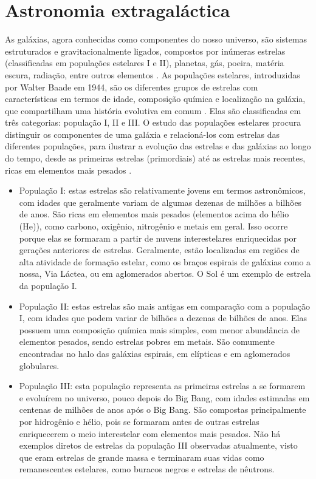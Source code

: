 \section{Astronomia extragaláctica}

As galáxias, agora conhecidas como componentes do nosso universo, são sistemas estruturados e gravitacionalmente ligados, compostos por inúmeras estrelas (classificadas em populações estelares I e II), planetas, gás, poeira, matéria escura, radiação, entre outros elementos \cite{2018inpe}. As populações estelares, introduzidas por Walter Baade em 1944, são os diferentes grupos de estrelas com características em termos de idade, composição química e localização na galáxia, que compartilham uma história evolutiva em comum \cite{2010arnab}. Elas são classificadas em três categorias: população I, II e III. O estudo das populações estelares procura distinguir os componentes de uma galáxia e relacioná-los com estrelas das diferentes populações, para ilustrar a evolução das estrelas e das galáxias ao longo do tempo, desde as primeiras estrelas (primordiais) até as estrelas mais recentes, ricas em elementos mais pesados \cite{2023Kepler}.

\begin{itemize}
  \item População I: estas estrelas são relativamente jovens em termos astronômicos, com idades que geralmente variam de algumas dezenas de milhões a bilhões de anos. São ricas em elementos mais pesados (elementos acima do hélio (He)), como carbono, oxigênio, nitrogênio e metais em geral. Isso ocorre porque elas se formaram a partir de nuvens interestelares enriquecidas por gerações anteriores de estrelas. Geralmente, estão localizadas em regiões de alta atividade de formação estelar, como os braços espirais de galáxias como a nossa, Via Láctea, ou em aglomerados abertos. O Sol é um exemplo de estrela da população I.
  \item População II: estas estrelas são mais antigas em comparação com a população I, com idades que podem variar de bilhões a dezenas de bilhões de anos. Elas possuem uma composição química mais simples, com menor abundância de elementos pesados, sendo estrelas pobres em metais. São comumente encontradas no halo das galáxias espirais, em elípticas e em aglomerados globulares.
  \item População III: esta população representa as primeiras estrelas a se formarem e evoluírem no universo, pouco depois do Big Bang, com idades estimadas em centenas de milhões de anos após o Big Bang. São compostas principalmente por hidrogênio e hélio, pois se formaram antes de outras estrelas enriquecerem o meio interestelar com elementos mais pesados. Não há exemplos diretos de estrelas da população III observadas atualmente, visto que eram estrelas de grande massa e terminaram suas vidas como remanescentes estelares, como buracos negros e estrelas de nêutrons.
\end{itemize}

